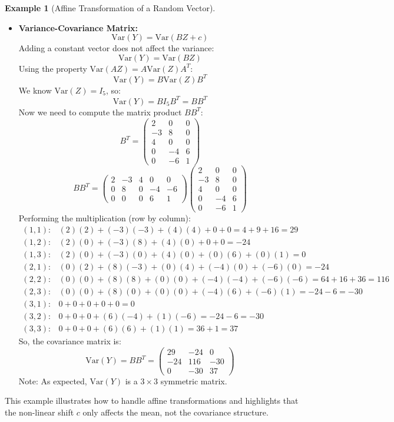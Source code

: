 \documentclass[11pt]{article}
\theoremstyle{definition}
\newtheorem{example}[theorem]{Example}
\newcommand{\Var}{\mathrm{Var}} %
\newcommand{\T}{^T} %
\begin{document}
\begin{example}[Affine Transformation of a Random Vector]
\begin{enumerate}
\begin{itemize}
        \item \textbf{Variance-Covariance Matrix:}
        \[ \Var(Y) = \Var(BZ + c) \]
        Adding a constant vector does not affect the variance:
        \[ \Var(Y) = \Var(BZ) \]
        Using the property $\Var(AZ) = A \Var(Z) A\T$:
        \[ \Var(Y) = B \Var(Z) B\T \]
        We know $\Var(Z) = I_5$, so:
        \[ \Var(Y) = B I_5 B\T = B B\T \]
        Now we need to compute the matrix product $B B\T$:
        \[ B\T = \begin{pmatrix} 2 & 0 & 0 \\ -3 & 8 & 0 \\ 4 & 0 & 0 \\ 0 & -4 & 6 \\ 0 & -6 & 1 \end{pmatrix} \]
        \[
        B B\T = \begin{pmatrix} 2 & -3 & 4 & 0 & 0 \\ 0 & 8 & 0 & -4 & -6 \\ 0 & 0 & 0 & 6 & 1 \end{pmatrix}
        \begin{pmatrix} 2 & 0 & 0 \\ -3 & 8 & 0 \\ 4 & 0 & 0 \\ 0 & -4 & 6 \\ 0 & -6 & 1 \end{pmatrix}
        \]
        Performing the multiplication (row by column):
        \begin{align*} (1,1): & (2)(2) + (-3)(-3) + (4)(4) + 0 + 0 = 4 + 9 + 16 = 29 \\ (1,2): & (2)(0) + (-3)(8) + (4)(0) + 0 + 0 = -24 \\ (1,3): & (2)(0) + (-3)(0) + (4)(0) + (0)(6) + (0)(1) = 0 \\ (2,1): & (0)(2) + (8)(-3) + (0)(4) + (-4)(0) + (-6)(0) = -24 \\ (2,2): & (0)(0) + (8)(8) + (0)(0) + (-4)(-4) + (-6)(-6) = 64 + 16 + 36 = 116 \\ (2,3): & (0)(0) + (8)(0) + (0)(0) + (-4)(6) + (-6)(1) = -24 - 6 = -30 \\ (3,1): & 0 + 0 + 0 + 0 + 0 = 0 \\ (3,2): & 0 + 0 + 0 + (6)(-4) + (1)(-6) = -24 - 6 = -30 \\ (3,3): & 0 + 0 + 0 + (6)(6) + (1)(1) = 36 + 1 = 37 \end{align*}
        So, the covariance matrix is:
        \[
        \Var(Y) = B B\T = \begin{pmatrix} 29 & -24 & 0 \\ -24 & 116 & -30 \\ 0 & -30 & 37 \end{pmatrix}
        \]
        Note: As expected, $\Var(Y)$ is a $3 \times 3$ symmetric matrix.
    \end{itemize}
\end{enumerate}
This example illustrates how to handle affine transformations and highlights that the non-linear shift $c$ only affects the mean, not the covariance structure.
\end{example}
\end{document}
